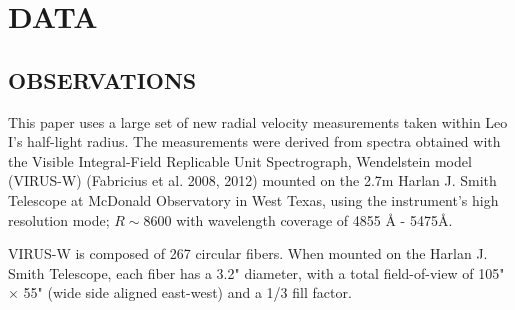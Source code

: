 \documentclass[%
 aip,
 twocolumn,
 jmp,%
 amsmath,amssymb,
 reprint,%
]{aastex61}
\begin{document}










\section{DATA}

\subsection{OBSERVATIONS}

This paper uses a large set of new radial velocity measurements taken within Leo I's half-light radius. The measurements were derived from spectra obtained with the Visible Integral-Field Replicable Unit Spectrograph, Wendelstein model (VIRUS-W) (Fabricius et al. 2008, 2012) mounted on the 2.7m Harlan J. Smith Telescope at McDonald Observatory in West Texas, using the instrument's high resolution mode; $R \sim 8600$ with wavelength coverage of 4855 \r{A} - 5475\r{A}. 

VIRUS-W is composed of 267 circular fibers. When mounted on the Harlan J. Smith Telescope, each fiber has a 3.2" diameter, with a total field-of-view of 105"  $\times$ 55" (wide side aligned east-west) and a 1/3 fill factor.
\end{document}
